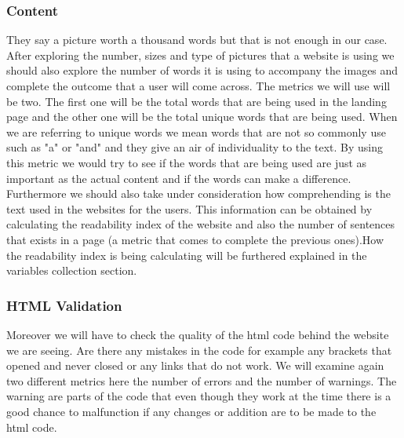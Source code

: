 \documentclass{article}
\begin{document}
\subsubsection{Content} \label{M:Content}
They say a picture worth a thousand words but that is not enough in our case. After exploring the number, sizes and type of pictures that a website is using we should also explore the number of words it is using to accompany the images and complete the outcome that a user will come across. The metrics we will use will be two. The first one will be the total words that are being used in the landing page and the other one will be the total unique words that are being used. When we are referring to unique words we mean words that are not so commonly use such as "a" or "and" and they give an air of individuality to the text. By using this metric we would try to see if the words that are being used are just as important as the actual content and if the words can make a difference.\\
Furthermore we should also take under consideration how comprehending is the text used in the websites for the users. This information can be obtained by calculating the readability index of the website and also the number of sentences that exists in a page (a metric that comes to complete the previous ones).How the readability index is being calculating will be furthered explained in the variables collection section.
\subsubsection{HTML Validation} \label{M:HTML Validation} Moreover we will have to check the quality of the html code behind the website we are seeing. Are there any mistakes in the code for example any brackets that opened and never closed or any links that do not work. We will examine again two different metrics here the number of errors and the number of warnings. The warning are parts of the code that even though they work at the time there is a good chance to malfunction if any changes or addition are to be made to the html code. 
\newpage
\end{document}
